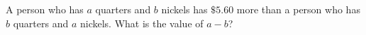 A person who has $a$ quarters and $b$ nickels has $\$5.60$ more than a person who has $b$ quarters and $a$ nickels. What is the value of $a-b$?
